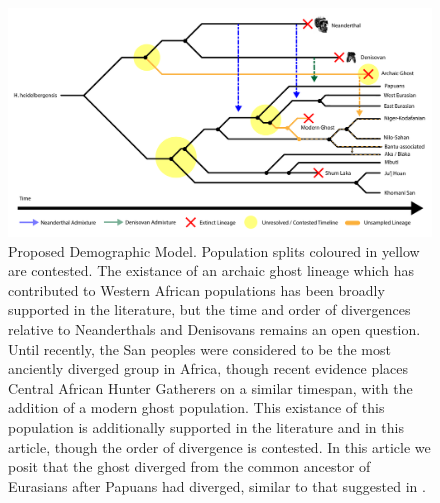 \documentclass{article}
\begin{document}
\begin{figure}
	\centering
	\includegraphics[width=\textwidth]{../plot/dem2.pdf}
	\caption{Proposed Demographic Model. Population splits coloured in yellow are contested. The existance of an archaic ghost lineage which has contributed to Western African populations has been broadly supported in the literature, but the time and order of divergences relative to Neanderthals and Denisovans remains an open question. Until recently, the San peoples were considered to be the most anciently diverged group in Africa, though recent evidence places Central African Hunter Gatherers on a similar timespan, with the addition of a modern ghost population. This existance of this population is additionally supported in the literature and in this article, though the order of divergence is contested. In this article we posit that the ghost diverged from the common ancestor of Eurasians after Papuans had diverged, similar to that suggested in \cite{Malaspinas2016}.}
	\label{fig_dem}
\end{figure}
\end{document}
